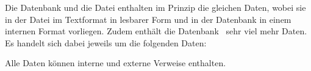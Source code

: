 Die Datenbank und die Datei enthalten im Prinzip die gleichen Daten, wobei sie in der Datei im Textformat in lesbarer Form und in der Datenbank in einem internen Format vorliegen.
Zudem enthält die Datenbank \textiAlg\ sehr viel mehr Daten. Es handelt sich dabei jeweils um die folgenden Daten:
\begin{description}
	\item[]         \label{Daten:Axiom}         
	\item[]         \label{Daten:Satz}          
	\item[]        \label{Daten:Beweis}        
	\item[]   \label{Daten:Fachbegriff}   
	\item[]    \label{Daten:Fachgebiet}    
	\item[]\label{Daten:Ausgabeschema} 
	\item[]   \label{Daten:Auswertung}    
\end{description}
Alle Daten können interne und externe Verweise enthalten.

